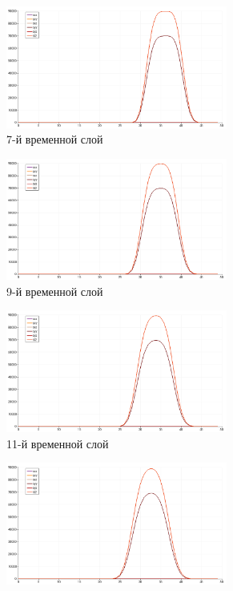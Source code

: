 \begin{figure}[htp]
\begin{subfigure}[b]{0.5\textwidth}
\includegraphics[width=0.8\textwidth]{png/p-wave-test/s/0007.png}
\caption{7-й временной слой}
\end{subfigure}
\begin{subfigure}[b]{0.5\textwidth}
\centering
\includegraphics[width=0.8\textwidth]{png/p-wave-test/s/0009.png}
\caption{9-й временной слой}
\end{subfigure}
\begin{subfigure}[b]{0.5\textwidth}
\centering
\includegraphics[width=0.8\textwidth]{png/p-wave-test/s/0011.png}
\caption{11-й временной слой}
\end{subfigure}
\begin{subfigure}[b]{0.5\textwidth}
\centering
\includegraphics[width=0.8\textwidth]{png/p-wave-test/s/0013.png}

\end{subfigure}
\end{figure}
